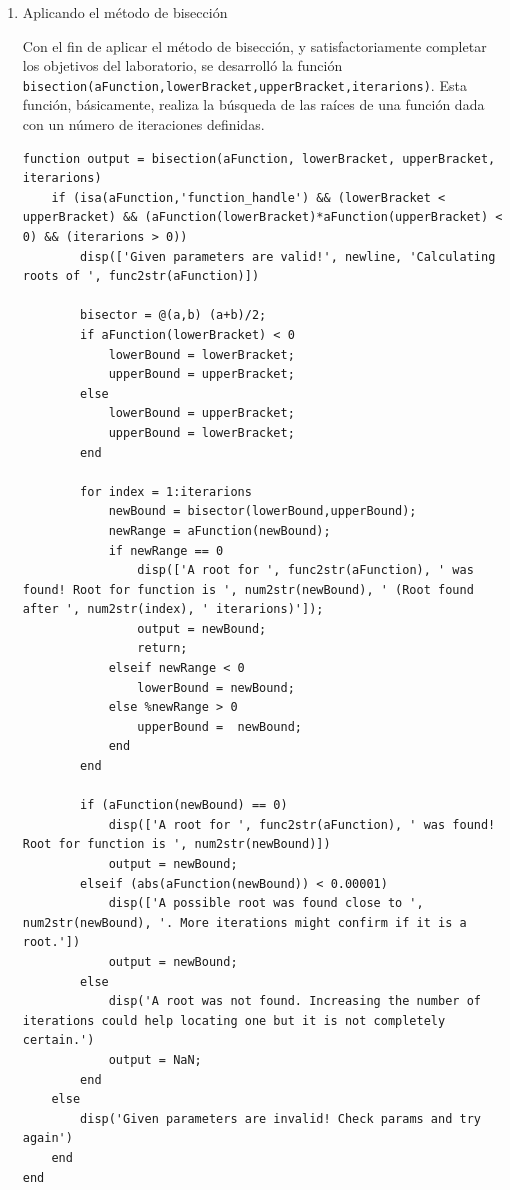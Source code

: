 \documentclass[english,notitlepage,letterpaper, 10pt]{article} %
\begin{document}
\begin{enumerate}
\begin{enumerate}
      \item Aplicando el método de bisección
      
      Con el fin de aplicar el método de bisección, y satisfactoriamente completar los objetivos del laboratorio, se desarrolló la función \texttt{bisection(aFunction,lowerBracket,upperBracket,iterarions)}. Esta función, básicamente, realiza la búsqueda de las raíces de una función dada con un número de iteraciones definidas.

      \begin{lstlisting}
function output = bisection(aFunction, lowerBracket, upperBracket, iterarions)
    if (isa(aFunction,'function_handle') && (lowerBracket < upperBracket) && (aFunction(lowerBracket)*aFunction(upperBracket) < 0) && (iterarions > 0))
        disp(['Given parameters are valid!', newline, 'Calculating roots of ', func2str(aFunction)])

        bisector = @(a,b) (a+b)/2;
        if aFunction(lowerBracket) < 0
            lowerBound = lowerBracket;
            upperBound = upperBracket;
        else
            lowerBound = upperBracket;
            upperBound = lowerBracket;
        end
        
        for index = 1:iterarions
            newBound = bisector(lowerBound,upperBound);
            newRange = aFunction(newBound);
            if newRange == 0
                disp(['A root for ', func2str(aFunction), ' was found! Root for function is ', num2str(newBound), ' (Root found after ', num2str(index), ' iterarions)']);
                output = newBound;
                return;
            elseif newRange < 0
                lowerBound = newBound;
            else %newRange > 0
                upperBound =  newBound;
            end
        end

        if (aFunction(newBound) == 0)
            disp(['A root for ', func2str(aFunction), ' was found! Root for function is ', num2str(newBound)])
            output = newBound;
        elseif (abs(aFunction(newBound)) < 0.00001)
            disp(['A possible root was found close to ', num2str(newBound), '. More iterations might confirm if it is a root.'])
            output = newBound;
        else
            disp('A root was not found. Increasing the number of iterations could help locating one but it is not completely certain.')
            output = NaN;
        end
    else 
        disp('Given parameters are invalid! Check params and try again')
    end
end
      \end{lstlisting}


\end{enumerate}
\end{enumerate}
\end{document}
